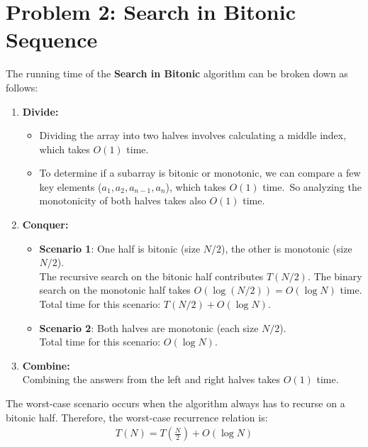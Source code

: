 \documentclass[11pt, a4paper, oneside]{memoir}
\begin{document}
\chapter{Problem 2: Search in Bitonic Sequence}
The running time of the \textbf{Search in Bitonic} algorithm can be broken down as follows:
\begin{enumerate}
    \item \textbf{Divide:}
    \begin{itemize}
        \item Dividing the array into two halves involves calculating a middle index, which takes $O(1)$ time.
        \item To determine if a subarray is bitonic or monotonic, we can compare a few key elements ($a_1, a_2, a_{n-1}, a_n$), which takes $O(1)$ time.\
        So analyzing the monotonicity of both halves takes also $O(1)$ time.
    \end{itemize}
    \item \textbf{Conquer:}
    \begin{itemize}
        \item \textbf{Scenario 1}: One half is bitonic (size $N/2$), the other is monotonic (size $N/2$).\\
        The recursive search on the bitonic half contributes $T(N/2)$.
        The binary search on the monotonic half takes $O(\log(N/2)) = O(\log N)$ time.
        Total time for this scenario: $T(N/2) + O(\log N)$.
        \item \textbf{Scenario 2}: Both halves are monotonic (each size $N/2$).\\
        Total time for this scenario: $O(\log N)$.
    \end{itemize}
    \item \textbf{Combine:} \\
    Combining the answers from the left and right halves takes $O(1)$ time.
\end{enumerate}

The worst-case scenario occurs when the algorithm always has to recurse on a bitonic half. Therefore, the worst-case recurrence relation is:
\begin{align*}
    T(N) = T(\frac{N}{2}) + O(\log N)
\end{align*}
\end{document}
